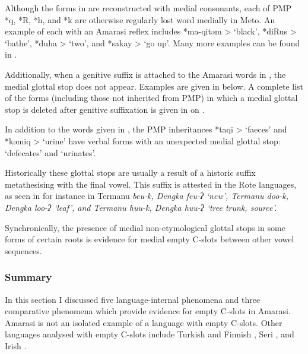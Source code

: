 Although the forms in  are
reconstructed with medial consonants,
each of PMP *q, *R, *h, and *k are otherwise regularly lost word medially in Meto.
An example of each with an Amarasi reflex includes *ma-qitəm >  `black',
*diRus >  `bathe', *duha >  `two', and *sakay >  `go up'.
Many more examples can be found in \citet{ed16b}.

Additionally, when a genitive suffix is attached to
the Amarasi words in ,
the medial glottal stop does not appear.
Examples are given in  below.
A complete list of the forms (including those not inherited from PMP)
in which a medial glottal stop is deleted after genitive suffixation
is given in  on .

\begin{exe}
	\label{ex:MedGloStoDel}
\end{exe}

In addition to the words given in ,
the PMP inheritances *taqi >  `faeces' 
and  *kəmiq >  `urine' have verbal forms
with an unexpected medial glottal stop:  `defecates'
and  `urinates'.

Historically these glottal stops are usually a result
of a historic suffix metathesising with the final vowel.
This suffix is attested in the Rote languages,
as seen in for instance in Termanu \it{beu-k}, Dengka \it{feu-ʔ} `new',
Termanu \it{doo-k}, Dengka \it{loo-ʔ} `leaf', and
Termanu \it{huu-k}, Dengka \it{huu-ʔ} `tree trunk, source'.

Synchronically, the presence of medial non-etymological
glottal stops in some forms of certain roots is evidence
for medial empty C-slots between other vowel sequences.

\subsubsection{Summary}
In this section I discussed five language-internal phenomena
and three comparative phenomena which provide evidence for
empty C-slots in Amarasi.
Amarasi is not an isolated example of a language with empty C-slots.
Other languages analysed with empty C-slots include
Turkish and Finnish \citep{clke83},
Seri \citep{mast83}, and Irish \citep{an16}.

